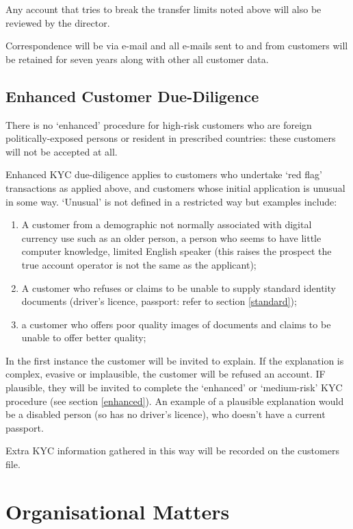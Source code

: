 \documentclass[12pt]{report}
\begin{document}
Any account that tries to break the transfer limits noted above will also be reviewed by the director.

Correspondence will be via e-mail and all e-mails sent to and from customers will be retained for seven years along with other all customer data.

\subsection{Enhanced Customer Due-Diligence} \label{red-flags}

There is no `enhanced' procedure for high-risk customers who are foreign politically-exposed persons or resident in prescribed countries:
these customers will not be accepted at all.

Enhanced KYC due-diligence applies to customers who undertake `red flag' transactions as applied above, and customers whose initial
application is unusual in some way. `Unusual' is not defined in a restricted way but examples include:
\begin{enumerate}
\item A customer from a demographic not normally associated with digital currency use
  such as an older person, a person who seems to have little computer knowledge,
  limited English speaker (this raises the prospect the true account operator is not the same as the applicant);
\item A customer who refuses or claims to be unable to supply standard identity documents (driver's licence, passport: refer to section
  \ref{standard});
\item a customer who offers poor quality images of documents and claims to be unable to offer better quality;
\end{enumerate}

In the first instance the customer will be invited to explain. If the explanation is complex, evasive or implausible, the customer will be
refused an account. IF plausible, they will be invited to complete the `enhanced' or `medium-risk' KYC procedure (see section \ref{enhanced}).
An example of a plausible explanation would be a disabled person (so has no driver's licence), who doesn't have a current passport.

Extra KYC information gathered in this way will be recorded on the customers file.

\section{Organisational Matters}
\end{document}
